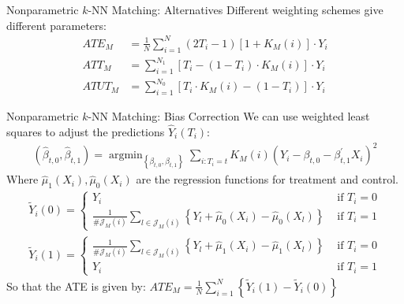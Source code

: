 \documentclass[xcolor=pdftex,dvipsnames,table,mathserif,aspectratio=169]{beamer}
\begin{document}
\begin{frame}{Nonparametric $k$-NN Matching: Alternatives}
Different weighting schemes give different parameters:
\begin{align*}
ATE_M&=\frac{1}{N} \sum_{i=1}^{N} \left(2 T_{i}-1\right)\left[1+K_{M}(i)\right] \cdot Y_{i} \\
ATT_M&=\sum_{i=1}^{N_1} \left[T_{i}-(1-T_i) \cdot K_{M}(i)\right] \cdot  Y_{i}\\
ATUT_M&=\sum_{i=1}^{N_0} \left[T_{i}\cdot K_{M}(i) -(1-T_i) \right] \cdot Y_{i}
\end{align*}
\end{frame}


\begin{frame}{Nonparametric $k$-NN Matching: Bias Correction}
We can use weighted least squares to adjust the predictions $\hat{Y}_i(T_i)$:
\begin{align*}
\left(\widehat{\beta}_{t, 0}, \widehat{\beta}_{t, 1}\right)=\operatorname{argmin}_{\left\{\beta_{t, 0}, \beta_{t, 1}\right\}} \sum_{i: T_{i}=t} K_{M}(i)\left(Y_{i}-\beta_{t, 0}-\beta_{t, 1}^{\prime} X_{i}\right)^{2}
\end{align*}
Where $\widehat{\mu}_1(X_i),\widehat{\mu}_0(X_i)$ are the regression functions for treatment and control.
\begin{align*}
\tilde{Y}_{i}(0)=\left\{\begin{array}{cc}
Y_{i} & \text { if } T_{i}=0 \\
\frac{1}{\# \mathcal{J}_{M}(i)} \sum_{l \in \mathcal{J}_{M}(i)}\left\{Y_{l}+\widehat{\mu}_{0}\left(X_{i}\right)-\widehat{\mu}_{0}\left(X_{l}\right)\right\} & \text { if } T_{i}=1
\end{array}\right. \\
\tilde{Y}_{i}(1)=\left\{\begin{array}{cc}
\frac{1}{\# \mathcal{J}_{M}(i)} \sum_{l \in \mathcal{J}_{M}(i)}\left\{Y_{l}+\widehat{\mu}_{1}\left(X_{i}\right)-\widehat{\mu}_{1}\left(X_{l}\right)\right\} & \text { if } T_{i}=0 \\
Y_{i} & \text { if } T_{i}=1
\end{array}\right.
\end{align*}
So that the ATE is given by: $ATE_M=\frac{1}{N} \sum_{i=1}^{N}\left\{\tilde{Y}_{i}(1)-\tilde{Y}_{i}(0)\right\}$
\end{frame}
\end{document}
